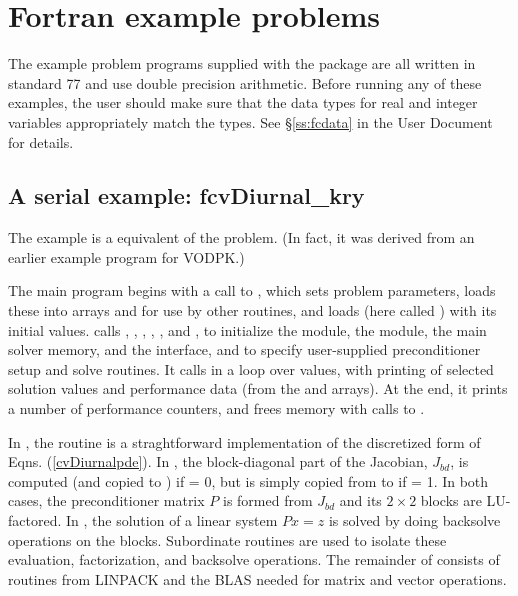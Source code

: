 \section{Fortran example problems}\label{s:ex_fortran}

The {\F} example problem programs supplied with the {\cvode}
package are all written in standard {\F}77 and use double precision
arithmetic.  Before running any of these examples, the user should
make sure that the {\F} data types for real and integer variables
appropriately match the {\CC} types.  See \S\ref{ss:fcdata} in the
{\cvode} User Document for details.

\subsection{A serial example: fcvDiurnal\_kry}\label{ss:fcvDiurnal} 
The  example is a {\F} equivalent of the  problem.
(In fact, it was derived from an earlier {\F} example program for VODPK.)

The main program begins with a call to , which sets problem
parameters, loads these into arrays  and  for use by other
routines, and loads  (here called ) with its initial values.
 calls , , , 
, , and ,
to initialize the {\nvecs} module, the {\sunlinsolspgmr} module, the
main solver memory, and the {\cvls} interface, 
and to specify user-supplied preconditioner setup and solve routines.
It calls  in a loop over  values, with printing of
selected solution values and performance data (from the   and 
arrays).  At the end, it prints a number of performance counters, and
frees memory with calls to .

In , the  routine is a straghtforward implementation
of the discretized form of Eqns. (\ref{cvDiurnalpde}).  In , the
block-diagonal part of the Jacobian, $J_{bd}$, is computed (and copied to
) if  = 0, but is simply copied from  to  if
 = 1.  In both cases, the preconditioner matrix $P$ is formed from 
$J_{bd}$ and its $2 \times 2$ blocks are LU-factored.  In ,
the solution of a linear system $Px = z$ is solved by doing backsolve
operations on the blocks.  Subordinate routines are used to isolate
these evaluation, factorization, and backsolve operations.
The remainder of  consists of
routines from LINPACK and the BLAS needed for matrix and vector operations.

